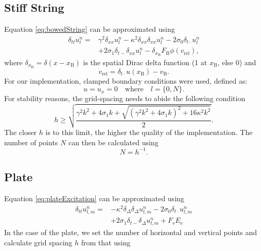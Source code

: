 \documentclass{article}
\begin{document}
\subsection{Stiff String}\label{subsec:stiffStringFDS}
Equation \eqref{eq:bowedString} can be approximated using
\begin{equation}
\begin{aligned}\label{eq:discreteString}
\delta_{tt} u_l^n =&\gamma^2 \delta_{xx} u_l^n -\kappa^2\delta_{xx}\delta_{xx} u_l^n - 2\sigma_0\delta_{t\cdot} u_l^n  \\
&+ 2\sigma_1\delta_{t-}\delta_{xx}u_l^n - \delta_{x_\text{B}}F_\text{B}\phi(v_\text{rel}),
\end{aligned}
\end{equation}
where $\delta_{x_\text{B}} = \delta(x-x_\text{B})$ is the spatial Dirac delta function (1 at $x_\text{B}$, else 0) and 
\begin{equation}\label{eq:descreteRelativeVel}
    v_\text{rel} = \delta_{t\cdot}u(x_\text{B})-v_\text{B}.
\end{equation}
For our implementation, clamped boundary conditions were used, defined as:
\begin{equation}\label{boundary}
    u = u_x = 0 \quad \text{where} \quad l = \{0, N\}.
  \end{equation}
For stability reasons, the grid-spacing needs to abide the following condition
\begin{equation}
    h \geq \sqrt{\frac{\gamma^2 k^2 + 4 \sigma_1 k + \sqrt {(\gamma^2 k^2 + 4 \sigma_1 k)^2 + 16 \kappa^2 k^2}}{2}}.
\end{equation}
The closer $h$ is to this limit, the higher the quality of the implementation. The number of points $N$ can then be calculated using 
\begin{equation}
    N = h^{-1}.
\end{equation}


\subsection{Plate}
  

Equation \eqref{eq:plateExcitation} can be approximated using
\begin{equation}
    \begin{aligned}\label{eq:plateFDS}
        \delta_{tt}u_{l,m}^n = &-\kappa^2 \delta_\Delta\delta_\Delta u_{l,m}^n - 2\sigma_0\delta_{t\cdot}u_{l,m}^n \\
        &+ 2\sigma_1\delta_{t−}\delta_\Delta u_{l,m}^n + F_\text{e}E_\text{e}
    \end{aligned}
\end{equation}
In the case of the plate, we set the number of horizontal and vertical points and calculate grid spacing $h$ from that using 
\end{document}
